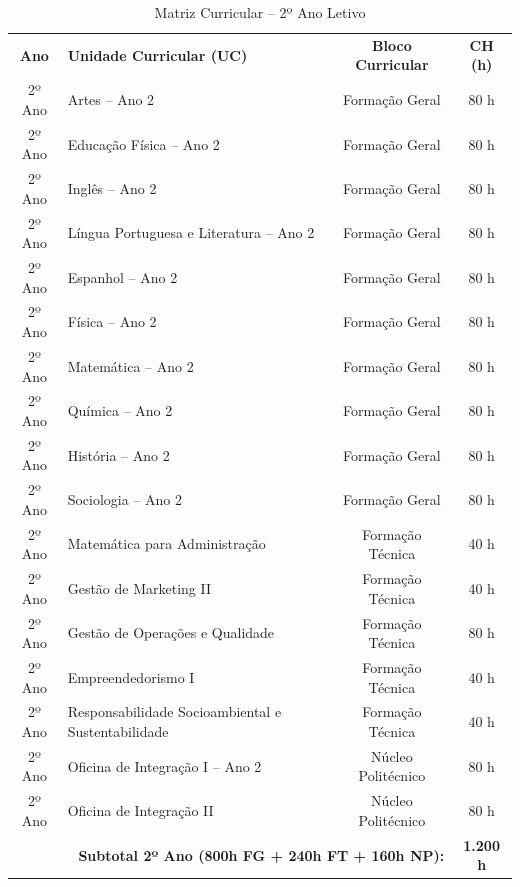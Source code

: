 \begin{table}[H]
\centering
\small
\begin{tabularx}{\linewidth}{|c|X|c|c|}
\hline
\rowcolor{ifscgreen!20}
\multicolumn{4}{|c|}{\textbf{\large 2º ANO LETIVO (SEMESTRES 1 E 2)}} \\ \hline
\rowcolor{cinzaTabela}
\textbf{Ano} & \textbf{Unidade Curricular (UC)} & \textbf{Bloco Curricular} & \textbf{CH (h)} \\ \hline
2º Ano & Artes -- Ano 2 & Formação Geral & 80 h \\ \hline
2º Ano & Educação Física -- Ano 2 & Formação Geral & 80 h \\ \hline
2º Ano & Inglês -- Ano 2 & Formação Geral & 80 h \\ \hline
2º Ano & Língua Portuguesa e Literatura -- Ano 2 & Formação Geral & 80 h \\ \hline
2º Ano & Espanhol -- Ano 2 & Formação Geral & 80 h \\ \hline
2º Ano & Física -- Ano 2 & Formação Geral & 80 h \\ \hline
2º Ano & Matemática -- Ano 2 & Formação Geral & 80 h \\ \hline
2º Ano & Química -- Ano 2 & Formação Geral & 80 h \\ \hline
2º Ano & História -- Ano 2 & Formação Geral & 80 h \\ \hline
2º Ano & Sociologia -- Ano 2 & Formação Geral & 80 h \\ \hline
2º Ano & Matemática para Administração & Formação Técnica & 40 h \\ \hline
2º Ano & Gestão de Marketing II & Formação Técnica & 40 h \\ \hline
2º Ano & Gestão de Operações e Qualidade & Formação Técnica & 80 h \\ \hline
2º Ano & Empreendedorismo I & Formação Técnica & 40 h \\ \hline
2º Ano & Responsabilidade Socioambiental e Sustentabilidade & Formação Técnica & 40 h \\ \hline
2º Ano & Oficina de Integração I -- Ano 2 & Núcleo Politécnico & 80 h \\ \hline
2º Ano & Oficina de Integração II & Núcleo Politécnico & 80 h \\ \hline
\multicolumn{3}{|r|}{\textbf{Subtotal 2º Ano (800h FG + 240h FT + 160h NP):}} & \textbf{1.200 h} \\ \hline
\end{tabularx}
\caption{Matriz Curricular -- 2º Ano Letivo}
\end{table}


